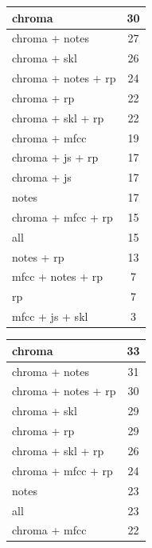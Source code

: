 \begin{table}[H]
	\begin{minipage}{0.5\textwidth}
		\begin{center}
			\begin{tabular}{|l||c|}
				\hline
				chroma & 30\\
				\hline
				chroma + notes & 27\\
				\hline
				chroma + skl & 26\\
				\hline
				chroma + notes + rp & 24\\
				\hline
				chroma + rp & 22\\
				\hline
				chroma + skl + rp & 22\\
				\hline
				chroma + mfcc & 19\\
				\hline
				chroma + js + rp & 17\\
				\hline
				chroma + js & 17\\
				\hline
				notes & 17\\
				\hline
				chroma + mfcc + rp & 15\\
				\hline
				all & 15\\
				\hline
				notes + rp & 13\\
				\hline
				mfcc + notes + rp & 7\\
				\hline
				rp & 7\\
				\hline
				mfcc + js + skl & 3\\
				\hline
			\end{tabular}
		\end{center}
	\end{minipage}
	\begin{minipage}{0.5\textwidth}
		\begin{center}
			\begin{tabular}{|l||c|}
				\hline
				chroma & 33\\
				\hline
				chroma + notes & 31\\
				\hline
				chroma + notes + rp & 30\\
				\hline
				chroma + skl & 29\\
				\hline
				chroma + rp & 29\\
				\hline
				chroma + skl + rp & 26\\
				\hline
				chroma + mfcc + rp & 24\\
				\hline
				notes & 23\\
				\hline
				all & 23\\
				\hline
				chroma + mfcc & 22\\

\end{tabular}
\end{center}
\end{minipage}
\end{table}
